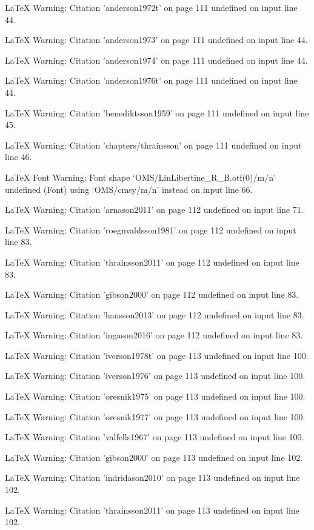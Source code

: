 LaTeX Warning: Citation 'anderson1972t' on page 111 undefined on input line 44.


LaTeX Warning: Citation 'anderson1973' on page 111 undefined on input line 44.


LaTeX Warning: Citation 'anderson1974' on page 111 undefined on input line 44.


LaTeX Warning: Citation 'anderson1976t' on page 111 undefined on input line 44.


LaTeX Warning: Citation 'benediktsson1959' on page 111 undefined on input line 45.


LaTeX Warning: Citation 'chapters/thrainsson' on page 111 undefined on input line 46.


LaTeX Font Warning: Font shape `OMS/LinLibertine_R_B.otf(0)/m/n' undefined
(Font)              using `OMS/cmsy/m/n' instead on input line 66.


LaTeX Warning: Citation 'arnason2011' on page 112 undefined on input line 71.


LaTeX Warning: Citation 'roegnvaldsson1981' on page 112 undefined on input line 83.


LaTeX Warning: Citation 'thrainsson2011' on page 112 undefined on input line 83.


LaTeX Warning: Citation 'gibson2000' on page 112 undefined on input line 83.


LaTeX Warning: Citation 'hansson2013' on page 112 undefined on input line 83.


LaTeX Warning: Citation 'ingason2016' on page 112 undefined on input line 83.


LaTeX Warning: Citation 'iverson1978t' on page 113 undefined on input line 100.


LaTeX Warning: Citation 'iverson1976' on page 113 undefined on input line 100.


LaTeX Warning: Citation 'oresnik1975' on page 113 undefined on input line 100.


LaTeX Warning: Citation 'oresnik1977' on page 113 undefined on input line 100.


LaTeX Warning: Citation 'valfells1967' on page 113 undefined on input line 100.


LaTeX Warning: Citation 'gibson2000' on page 113 undefined on input line 102.


LaTeX Warning: Citation 'indridason2010' on page 113 undefined on input line 102.


LaTeX Warning: Citation 'thrainsson2011' on page 113 undefined on input line 102.


